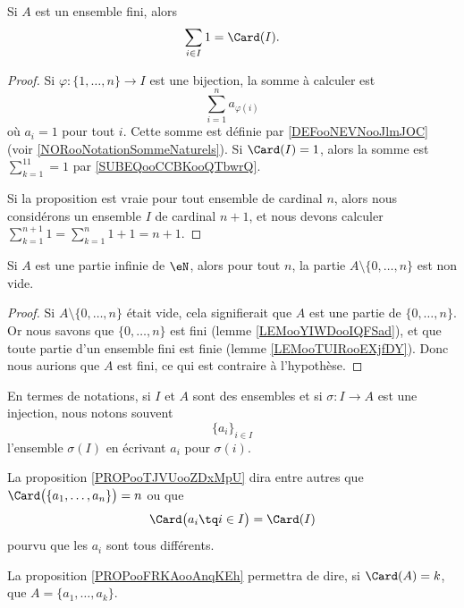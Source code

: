 \begin{lemma}	\label{LEMooVFNOooZenJSl}
	Si \( A\) est un ensemble fini, alors
	\begin{equation}
		\sum_{i\in I}1=\Card(I).
	\end{equation}
\end{lemma}

\begin{proof}
	Si \(\varphi \colon \{ 1,\ldots,n \}\to I  \) est une bijection, la somme à calculer est
	\begin{equation}
		\sum_{i=1}^na_{\varphi(i)}
	\end{equation}
	où \( a_i=1\) pour tout \( i\). Cette somme est définie par \ref{DEFooNEVNooJlmJOC} (voir \ref{NORooNotationSommeNaturels}). Si \( \Card(I)=1\), alors la somme est \( \sum_{k=1}^11=1\) par \eqref{SUBEQooCCBKooQTbwrQ}.

	Si la proposition est vraie pour tout ensemble de cardinal \( n\), alors nous considérons un ensemble \( I\) de cardinal \( n+1\), et nous devons calculer \( \sum_{k=1}^{n+1}1=\sum_{k=1}^n1+1=n+1\).
\end{proof}

\begin{lemma}       \label{LEMooRWUDooTgoRXH}
	Si \( A\) est une partie infinie de \( \eN\), alors pour tout \( n\), la partie \( A\setminus\{ 0,\ldots, n \}\) est non vide.
\end{lemma}

\begin{proof}
	Si \( A\setminus\{ 0,\ldots, n \}\) était vide, cela signifierait que \( A\) est une partie de \( \{ 0,\ldots, n \}\). Or nous savons que \( \{ 0,\ldots, n \}\) est fini (lemme \ref{LEMooYIWDooIQFSad}), et que toute partie d'un ensemble fini est finie (lemme \ref{LEMooTUIRooEXjfDY}). Donc nous aurions que \( A\) est fini, ce qui est contraire à l'hypothèse.
\end{proof}


\begin{normaltext}
	En termes de notations, si \( I\) et \( A\) sont des ensembles et si \(\sigma \colon I\to A  \) est une injection, nous notons souvent
	\begin{equation}
		\{ a_i \}_{i\in I}
	\end{equation}
	l'ensemble \( \sigma(I)\) en écrivant \( a_i\) pour \( \sigma(i)\).

	La proposition \ref{PROPooTJVUooZDxMpU} dira entre autres que \( \Card\big( \{ a_1,\ldots,a_n \} \big)=n\) ou que
	\begin{equation}
		\Card\big( a_i\tq i\in I \big)=\Card(I)
	\end{equation}
	pourvu que les \( a_i\) sont tous différents.

	La proposition \ref{PROPooFRKAooAnqKEh} permettra de dire, si \( \Card(A)=k\), que \( A=\{ a_1,\ldots,a_k \}\).
\end{normaltext}


